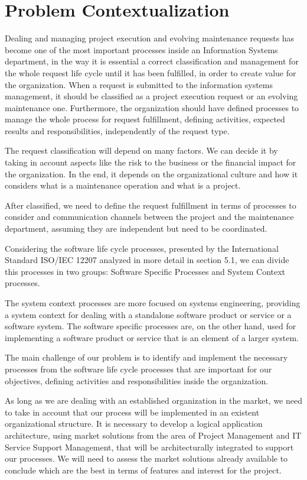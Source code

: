 
% 
% 

\section{Problem Contextualization}


Dealing and managing project execution and evolving maintenance requests has become one of the most important processes inside an Information Systems department, in the way it is essential a correct classification and management for the whole request life cycle until it has been fulfilled, in order to create value for the organization.
When a request is submitted to the information systems management, it should be classified as a project execution request or an evolving maintenance one. Furthermore, the organization should have defined processes to manage the whole process for request fulfillment, defining activities, expected results and responsibilities, independently of the request type.\par
The request classification will depend on many factors. We can decide it by taking in account aspects like the risk to the business or the financial impact for the organization. In the end, it depends on the organizational culture and how it considers what is a maintenance operation and what is a project.\par
After classified, we need to define the request fulfillment in terms of processes to consider and communication channels between the project and the maintenance department, assuming they are independent but need to be coordinated.\par
Considering the software life cycle processes, presented by the International Standard ISO/IEC 12207\cite{ISO12207} analyzed in more detail in section 5.1, we can divide this processes in two groups: Software Specific Processes and System Context processes.\par
The system context processes are more focused on systems engineering, providing a system context for dealing with a standalone software product or service or a software system. The software specific processes are, on the other hand, used for implementing a software product or service that is an element of a larger system. \par 
The main challenge of our problem is to identify and implement the necessary processes from the software life cycle processes that are important for our objectives, defining activities and responsibilities inside the organization.\par
As long as we are dealing with an established organization in the market, we need to take in account that our process will be implemented in an existent organizational structure. It is necessary to develop a logical application architecture, using market solutions from the area of Project Management and IT Service Support Management, that will be architecturally integrated to support our processes. We will need to assess the market solutions already available to conclude which are the best in terms of features and interest for the project. 
